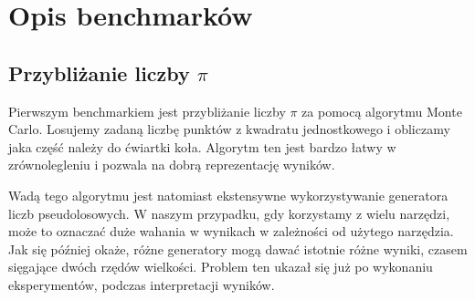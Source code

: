 \section{Opis benchmarków}

\subsection{Przybliżanie liczby $\pi$}

Pierwszym benchmarkiem jest przybliżanie liczby $\pi$ za pomocą
algorytmu Monte Carlo.
Losujemy zadaną liczbę punktów z kwadratu jednostkowego
i obliczamy jaka część należy do ćwiartki koła.
Algorytm ten jest bardzo łatwy w zrównolegleniu
i pozwala na dobrą reprezentację wyników.

Wadą tego algorytmu jest natomiast ekstensywne wykorzystywanie
generatora liczb pseudolosowych.
W naszym przypadku, gdy korzystamy z wielu narzędzi, może
to oznaczać duże wahania w wynikach w zależności od użytego narzędzia.
Jak się później okaże, różne generatory mogą dawać istotnie różne wyniki,
czasem sięgające dwóch rzędów wielkości.
Problem ten ukazał się już po wykonaniu eksperymentów,
podczas interpretacji wyników.

%
